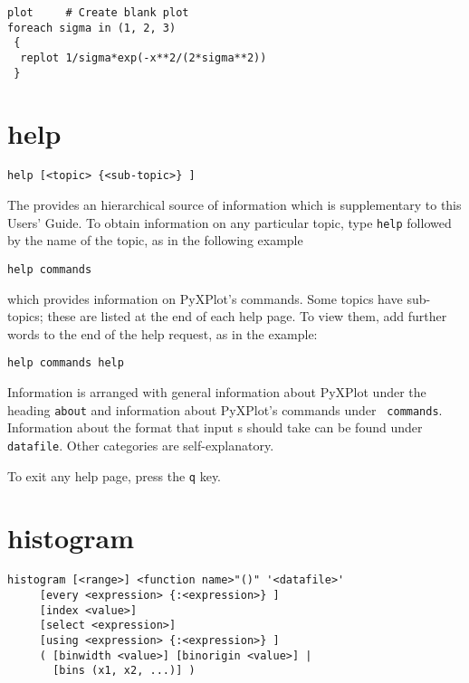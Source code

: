 \begin{verbatim}
plot     # Create blank plot
foreach sigma in (1, 2, 3)
 {
  replot 1/sigma*exp(-x**2/(2*sigma**2))
 }
\end{verbatim}


\section{help}

\begin{verbatim}
help [<topic> {<sub-topic>} ]
\end{verbatim}

The  provides an hierarchical source of information which is
supplementary to this Users' Guide.  To obtain information on any particular
topic, type {\tt help} followed by the name of the topic, as in the following
example

\begin{verbatim}
help commands
\end{verbatim}

\noindent which provides information on PyXPlot's commands. Some topics have
sub-topics; these are listed at the end of each help page. To view them, add
further words to the end of the help request, as in the example:

\begin{verbatim}
help commands help
\end{verbatim}

Information is arranged with general information about PyXPlot under the
heading {\tt about} and information about PyXPlot's commands under {\tt
commands}.  Information about the format that input \datafile s should take can
be found under {\tt datafile}.  Other categories are self-explanatory.

To exit any help page, press the {\tt q} key.


\section{histogram}

\begin{verbatim}
histogram [<range>] <function name>"()" '<datafile>'
     [every <expression> {:<expression>} ]
     [index <value>]
     [select <expression>]
     [using <expression> {:<expression>} ]
     ( [binwidth <value>] [binorigin <value>] |
       [bins (x1, x2, ...)] )
\end{verbatim}

